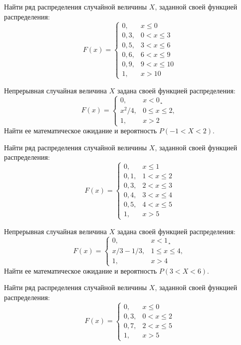 \vfill

\newpage\setcounter{zad}{0}

\z Найти ряд распределения случайной величины $X$, заданной своей функцией распределения: $$ F(x) = \begin{cases}0, & x \leqslant 0 \\ 0{,}3, & 0 < x \leqslant 3 \\ 0{,}5, & 3 < x \leqslant 6 \\ 0{,}6, & 6 < x \leqslant 9 \\ 0{,}9, & 9 < x \leqslant 10 \\ 1, & x > 10 \end{cases} $$


\vfill

\z Непрерывная случайная величина $X$ задана своей функцией распределения: $$ F(x) = \begin{cases}0, & x < 0¸\\ x^2/4, & 0 \leqslant x \leqslant 2, \\ 1, & x > 2 \end{cases} $$ Найти ее математическое ожидание и вероятность $P(-1 < X < 2)$.
 

\vfill

\newpage\setcounter{zad}{0}

\z Найти ряд распределения случайной величины $X$, заданной своей функцией распределения: $$ F(x) = \begin{cases}0, & x \leqslant 1 \\ 0{,}1, & 1 < x \leqslant 2 \\ 0{,}3, & 2 < x \leqslant 3 \\ 0{,}4, & 3 < x \leqslant 4 \\ 0{,}5, & 4 < x \leqslant 5 \\ 1, & x > 5 \end{cases} $$


\vfill

\z Непрерывная случайная величина $X$ задана своей функцией распределения: $$ F(x) = \begin{cases}0, & x < 1¸\\ x/3-1/3, & 1 \leqslant x \leqslant 4, \\ 1, & x > 4 \end{cases} $$ Найти ее математическое ожидание и вероятность $P(3 < X < 6)$.
 

\vfill

\newpage\setcounter{zad}{0}

\z Найти ряд распределения случайной величины $X$, заданной своей функцией распределения: $$ F(x) = \begin{cases}0, & x \leqslant 0 \\ 0{,}3, & 0 < x \leqslant 2 \\ 0{,}7, & 2 < x \leqslant 5 \\ 1, & x > 5 \end{cases} $$


